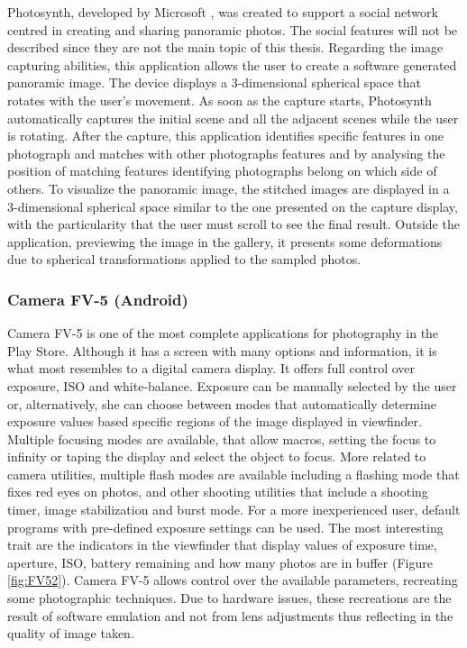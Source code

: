 Photosynth, developed by Microsoft \cite{Photosynth}, was created to support a social network centred in creating and sharing panoramic photos. The social features will not be described since they are not the main topic of this thesis.
Regarding the image capturing abilities, this application allows the user to create a software generated panoramic image. The device displays a 3-dimensional spherical space that rotates with the user's movement. As soon as the capture starts, Photosynth automatically captures the initial scene and all the adjacent scenes while the user is rotating. After the capture, this application identifies specific features in one photograph and matches with other photographs features and by analysing the position of matching features identifying photographs belong on which side of others. 
To visualize the panoramic image, the stitched images are displayed in a 3-dimensional spherical space similar to the one presented on the capture display, with the particularity that the user must scroll to see the final result. Outside the application, previewing the image in the gallery, it presents some deformations due to spherical transformations applied to the sampled photos. 


\subsubsection{Camera FV-5 (Android)}

Camera FV-5 is one of the most complete applications for photography in the Play Store. Although it has a screen with many options and information, it is what most resembles to a digital camera display. It offers full control over exposure, ISO and white-balance. Exposure can be manually selected by the user or, alternatively, she can choose between modes that automatically determine exposure values based specific regions of the image displayed in viewfinder. 
Multiple focusing modes are available, that allow macros, setting the focus to infinity or taping the display and select the object to focus.
More related to camera utilities, multiple flash modes are available including a flashing mode that fixes red eyes on photos, and other shooting utilities that include a shooting timer, image stabilization and burst mode.
For a more inexperienced user, default programs with pre-defined exposure settings can be used.
The most interesting trait are the indicators in the viewfinder that display values of exposure time, aperture, ISO, battery remaining and how many photos are in buffer (Figure \ref{fig:FV52}).
Camera FV-5 allows control over the available parameters, recreating some photographic techniques. Due to hardware issues, these recreations are the result of software emulation and not from lens adjustments thus reflecting in the quality of image taken.

